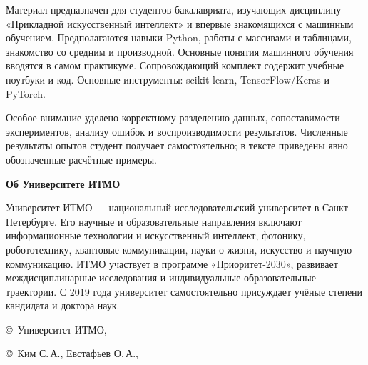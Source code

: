 \par\bigskip
Материал предназначен для студентов бакалавриата, изучающих дисциплину «Прикладной искусственный интеллект» и впервые знакомящихся с машинным обучением. Предполагаются навыки Python, работы с массивами и таблицами, знакомство со средним и производной. Основные понятия машинного обучения вводятся в самом практикуме. Сопровождающий комплект содержит учебные ноутбуки и код. Основные инструменты: scikit-learn, TensorFlow/Keras и PyTorch.
\par\bigskip
Особое внимание уделено корректному разделению данных, сопоставимости экспериментов, анализу ошибок и воспроизводимости результатов. Численные результаты опытов студент получает самостоятельно; в тексте приведены явно обозначенные расчётные примеры.
\par\bigskip
\noindent\textbf{Об Университете ИТМО}
\par\medskip
Университет ИТМО --- национальный исследовательский университет в Санкт-Петербурге. Его научные и образовательные направления включают информационные технологии и искусственный интеллект, фотонику, робототехнику, квантовые коммуникации, науки о жизни, искусство и научную коммуникацию. ИТМО участвует в программе «Приоритет-2030», развивает междисциплинарные исследования и индивидуальные образовательные траектории. С 2019 года университет самостоятельно присуждает учёные степени кандидата и доктора наук.
\par\bigskip
\noindent\copyright~Университет ИТМО, \BookYear\par
\noindent\copyright~Ким С.\,А., Евстафьев О.\,А., \BookYear
\endgroup
